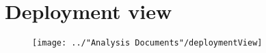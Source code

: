 \section{Deployment view}
\begin{figure}[H]
	\centering
	\texttt{[image: ../"Analysis Documents"/deploymentView]}
\end{figure}